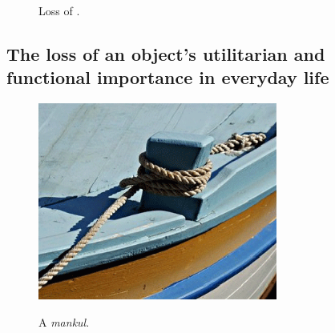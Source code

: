 \documentclass[output=paper]{LSP/langsci}
\begin{document}
\begin{figure}

\caption{Loss of .}
\label{fig:skevin:2}
\end{figure}


\subsection{The loss of an object’s utilitarian and functional importance in everyday life}
\begin{figure}[p]
\includegraphics[width=0.7\textwidth]{illustrations/skevin_fig3_mankul}
\label{fig3_mankul}
\caption{A \textit{mankul}.}
\end{figure}
 
\end{document}
